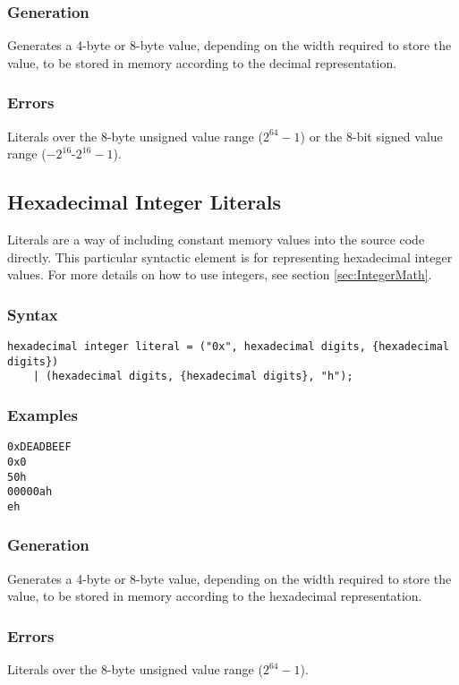 \documentclass[10pt,a4paper]{article}
\begin{document}
\subsubsection{Generation}
Generates a 4-byte or 8-byte value, depending on the width required to store the value, to be stored in memory according to the decimal representation. 

\subsubsection{Errors}
Literals over the 8-byte unsigned value range ($2^{64}-1$) or the 8-bit signed value range ($-2^{16}$-$2^{16}-1$).

\newpage




\subsection{Hexadecimal Integer Literals}
\label{sec:HexadecimalIntegerLiterals}
Literals are a way of including constant memory values into the source code directly. This particular syntactic element is for representing hexadecimal integer values. For more details on how to use integers, see section \ref{sec:IntegerMath}.

\subsubsection{Syntax}
\begin{verbatim}
hexadecimal integer literal = ("0x", hexadecimal digits, {hexadecimal digits})
    | (hexadecimal digits, {hexadecimal digits}, "h");
\end{verbatim}

\subsubsection{Examples}
\begin{verbatim}
0xDEADBEEF
0x0
50h
00000ah
eh
\end{verbatim}

\subsubsection{Generation}
Generates a 4-byte or 8-byte value, depending on the width required to store the value, to be stored in memory according to the hexadecimal representation. 

\subsubsection{Errors}
Literals over the 8-byte unsigned value range ($2^{64}-1$).
\end{document}
